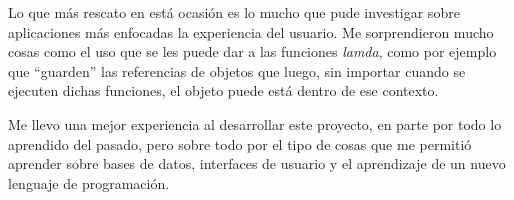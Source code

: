\documentclass{rep}
\begin{document}
    Lo que más rescato en está ocasión es lo mucho que pude investigar
    sobre aplicaciones más enfocadas la experiencia del usuario. Me
    sorprendieron mucho cosas como el uso que se les puede dar a las
    funciones \textit{lamda}, como por ejemplo que ``guarden'' las
    referencias de objetos que luego, sin importar cuando se ejecuten
    dichas funciones, el objeto puede está dentro de ese contexto.

    Me llevo una mejor experiencia al desarrollar este proyecto, en
    parte por todo lo aprendido del pasado, pero sobre todo por el
    tipo de cosas que me permitió aprender sobre bases de datos,
    interfaces de usuario y el aprendizaje de un nuevo lenguaje de
    programación. 

    \nocite{*}
    \printbibliography[heading=bibintoc]
	
\end{document}
